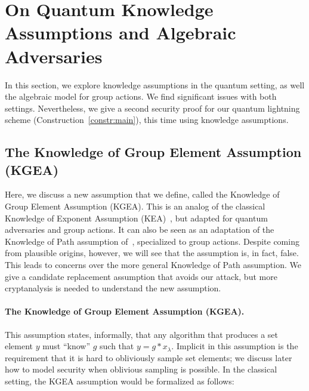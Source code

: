 \documentclass{article}\usepackage[a4paper,margin=20mm]{geometry}
\numberwithin{theorem}{section}
\numberwithin{equation}{section}
\begin{document}
\section{On Quantum Knowledge Assumptions and Algebraic Adversaries}\label{sec:knowledge}

In this section, we explore knowledge assumptions in the quantum setting, as well the algebraic model for group actions. We find significant issues with both settings. Nevertheless, we give a second security proof for our quantum lightning scheme (Construction~\ref{constr:main}), this time using knowledge assumptions.

\subsection{The Knowledge of Group Element Assumption (KGEA)}

Here, we discuss a new assumption that we define, called the Knowledge of Group Element Assumption (KGEA). This is an analog of the classical Knowledge of Exponent Assumption (KEA)~\cite{C:Damgard91}, but adapted for quantum adversaries and group actions. It can also be seen as an adaptation of the Knowledge of Path assumption of~\cite{EC:LiuMonZha23}, specialized to group actions. Despite coming from plausible origins, however, we will see that the assumption is, in fact, false. This leads to concerns over the more general Knowledge of Path assumption. We give a candidate replacement assumption that avoids our attack, but more cryptanalysis is needed to understand the new assumption.

\paragraph{The Knowledge of Group Element Assumption (KGEA).} This assumption states, informally, that any algorithm that produces a set element $y$ must ``know'' $g$ such that $y=g*x_\lambda$. Implicit in this assumption is the requirement that it is hard to obliviously sample set elements; we discuss later how to model security when oblivious sampling is possible. In the classical setting, the KGEA assumption would be formalized as follows:
\end{document}
